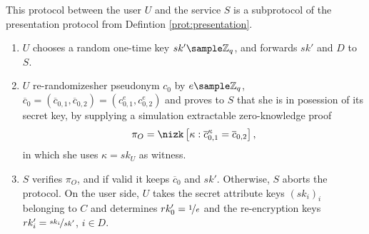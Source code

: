 \documentclass[runningheads]{llncs}
\newcommand{\Z}{\mathbb{Z}}
\DeclareMathOperator{\rekey}{\mathsf{ReKey}}
\begin{document}

\begin{definition}[$\rekey$ protocol]
\label{prot:rekey}
This protocol between the user $U$
and the service $S$ is  a subprotocol of the presentation protocol from Defintion \ref{prot:presentation}.
\begin{enumerate}
\item
$U$ chooses a random one-time key $sk'\sample\Z_q$, and forwards $sk'$ and $D$ to $S$.


\item
$U$  re-randomizes\footnotemark her pseudonym $c_0$ by $e\sample \Z_q$, $\overline c_0 = \left(\overline c_{0,1}, \overline c_{0,2}\right) = \left(c_{0,1}^{e}, c_{0,2}^{e}\right)$ and proves to $S$ that she is in posession of its secret key, by supplying a simulation extractable zero-knowledge proof
\[
\pi_O=\nizk\left[ \kappa : \overline c_{0,1}^\kappa = \overline c_{0,2}\right],
\] 
in which she uses $\kappa = sk_U$ as witness.

\item
$S$ verifies $\pi_O$, and if valid it keeps $\overline c_0$ and $sk'$.%
Otherwise, $S$ aborts the protocol.
On the user side, $U$ takes the secret attribute keys $(sk_i)_i$ belonging to $C$ and determines $rk_0'=\nicefrac{1}{e}$ and the re-encryption keys $rk_i' = \nicefrac{sk_i}{sk'}$, $i\in D$.
\end{enumerate}


\end{definition}
\end{document}
